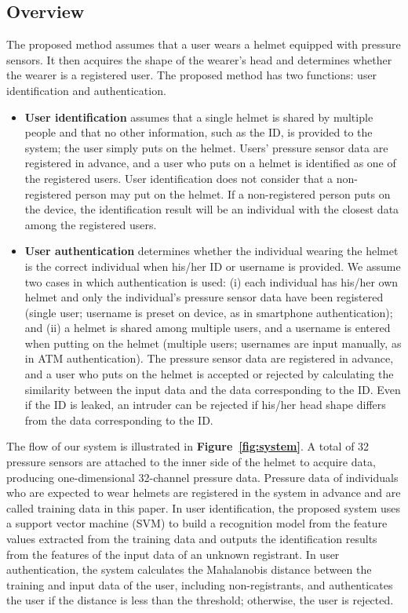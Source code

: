 \documentclass[sigconf,authordraft]{acmart}
\newcommand\figref[1]{\textbf{Figure~\ref{fig:#1}}}
\begin{document}
\subsection{Overview}
The proposed method assumes that a user wears a helmet equipped with pressure sensors. It then acquires the shape of the wearer's head and determines whether the wearer is a registered user. The proposed method has two functions: user identification and authentication.
\begin{itemize}
    \item {\bf User identification} assumes that a single helmet is shared by multiple people and that no other information, such as the ID, is provided to the system; the user simply puts on the helmet. Users' pressure sensor data are registered in advance, and a user who puts on a helmet is identified as one of the registered users. User identification does not consider that a non-registered person may put on the helmet. If a non-registered person puts on the device, the identification result will be an individual with the closest data among the registered users.
    
    \item {\bf User authentication} determines whether the individual wearing the helmet is the correct individual when his/her ID or username is provided. We assume two cases in which authentication is used: (i) each individual has his/her own helmet and only the individual's pressure sensor data have been registered (single user; username is preset on device, as in smartphone authentication); and (ii) a helmet is shared among multiple users, and a username is entered when putting on the helmet (multiple users; usernames are input manually, as in ATM authentication). The pressure sensor data are registered in advance, and a user who puts on the helmet is accepted or rejected by calculating the similarity between the input data and the data corresponding to the ID. Even if the ID is leaked, an intruder can be rejected if his/her head shape differs from the data corresponding to the ID.
\end{itemize}

The flow of our system is illustrated in \figref{system}. A total of 32 pressure sensors are attached to the inner side of the helmet to acquire data, producing one-dimensional 32-channel pressure data. Pressure data of individuals who are expected to wear helmets are registered in the system in advance and are called training data in this paper. In user identification, the proposed system uses a support vector machine (SVM) to build a recognition model from the feature values extracted from the training data and outputs the identification results from the features of the input data of an unknown registrant. In user authentication, the system calculates the Mahalanobis distance between the training and input data of the user, including non-registrants, and authenticates the user if the distance is less than the threshold; otherwise, the user is rejected.
\end{document}
